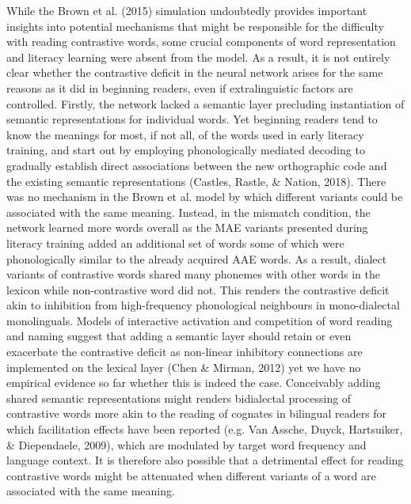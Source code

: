 \documentclass[doc,floatsintext]{apa6}
\begin{document}
While the Brown et al. (2015) simulation undoubtedly provides important
insights into potential mechanisms that might be responsible for the
difficulty with reading contrastive words, some crucial components of
word representation and literacy learning were absent from the model. As
a result, it is not entirely clear whether the contrastive deficit in
the neural network arises for the same reasons as it did in beginning
readers, even if extralinguistic factors are controlled. Firstly, the
network lacked a semantic layer precluding instantiation of semantic
representations for individual words. Yet beginning readers tend to know
the meanings for most, if not all, of the words used in early literacy
training, and start out by employing phonologically mediated decoding to
gradually establish direct associations between the new orthographic
code and the existing semantic representations (Castles, Rastle, \&
Nation, 2018). There was no mechanism in the Brown et al. model by which
different variants could be associated with the same meaning. Instead,
in the mismatch condition, the network learned more words overall as the
MAE variants presented during literacy training added an additional set
of words some of which were phonologically similar to the already
acquired AAE words. As a result, dialect variants of contrastive words
shared many phonemes with other words in the lexicon while
non-contrastive word did not. This renders the contrastive deficit akin
to inhibition from high-frequency phonological neighbours in
mono-dialectal monolinguals. Models of interactive activation and
competition of word reading and naming suggest that adding a semantic
layer should retain or even exacerbate the contrastive deficit as
non-linear inhibitory connections are implemented on the lexical layer
(Chen \& Mirman, 2012) yet we have no empirical evidence so far whether
this is indeed the case. Conceivably adding shared semantic
representations might renders bidialectal processing of contrastive
words more akin to the reading of cognates in bilingual readers for
which facilitation effects have been reported (e.g. Van Assche, Duyck,
Hartsuiker, \& Diependaele, 2009), which are modulated by target word
frequency and language context. It is therefore also possible that a
detrimental effect for reading contrastive words might be attenuated
when different variants of a word are associated with the same meaning.
\end{document}
